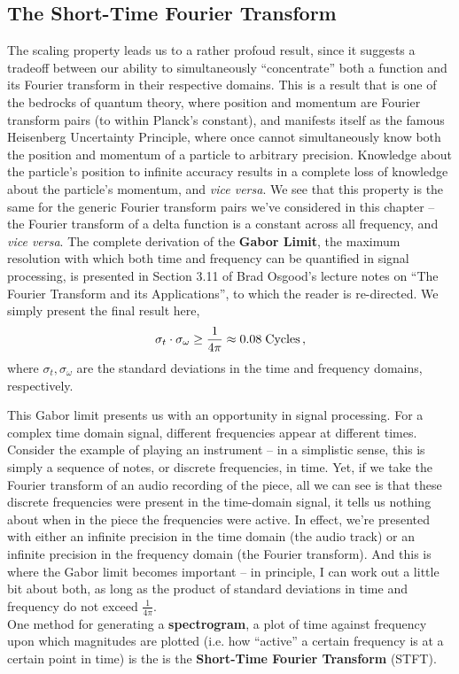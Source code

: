 \subsection{The Short-Time Fourier Transform}
%
The scaling property leads us to a rather profoud result, since it suggests
a tradeoff between our ability to simultaneously ``concentrate'' both a
function and its Fourier transform in their respective domains. This is a
result that is one of the bedrocks of quantum theory, where position and
momentum are Fourier transform pairs (to within Planck's constant), and
manifests itself as the famous Heisenberg Uncertainty Principle, where
once cannot simultaneously know both the position and momentum of a particle
to arbitrary precision. Knowledge about the particle's position to infinite
accuracy results in a complete loss of knowledge about the particle's
momentum, and \textit{vice versa}. We see that this property is the same for
the generic Fourier transform pairs we've considered in this chapter -- the
Fourier transform of a delta function is a constant across all frequency,
and \textit{vice versa}.
%
The complete derivation of the \textbf{Gabor Limit}, the maximum resolution
with which both time and frequency can be quantified in signal processing,
is presented in Section 3.11 of Brad Osgood's lecture notes on
``The Fourier Transform and its Applications'', to which the reader is
re-directed. We simply present the final result here,
%
\begin{equation}
  \sigma_t\cdot\sigma_\omega \geq \frac{1}{4\pi} \approx \textrm{0.08\;Cycles} \,,
\end{equation}
%
where $\sigma_t, \sigma_\omega$ are the standard deviations in the time and
frequency domains, respectively.

This Gabor limit presents us with an opportunity in signal processing. For a
complex time domain signal, different frequencies appear at different times.
Consider the example of playing an instrument -- in a simplistic sense,
this is simply a sequence of notes, or discrete frequencies, in time. Yet, if
we take the Fourier transform of an audio recording of the piece, all we can
see is that these discrete frequencies were present in the time-domain signal,
it tells us nothing about when in the piece the frequencies were active. In
effect, we're presented with either an infinite precision in the time domain
(the audio track) or an infinite precision in the frequency domain (the
Fourier transform). And this is where the Gabor limit becomes important -- in
principle, I can work out a little bit about both, as long as the product
of standard deviations in time and frequency do not exceed $\frac{1}{4\pi}$.\\

One method for generating a \textbf{spectrogram}, a plot of time against
frequency upon which magnitudes are plotted (i.e. how ``active'' a certain
frequency is at a certain point in time) is the is the
\textbf{Short-Time Fourier Transform} (STFT). 
